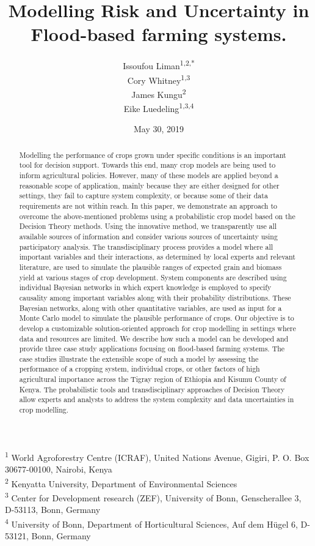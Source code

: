 \documentclass[12pt,oneside]{article}
\title{Modelling Risk and Uncertainty in Flood-based farming systems.}
\author{Issoufou Liman\textsuperscript{1,2,*} \\ Cory Whitney\textsuperscript{1,3} \\ James Kungu\textsuperscript{2} \\ Eike Luedeling\textsuperscript{1,3,4}}
\date{May 30, 2019}
\begin{document}
\maketitle
\begin{abstract}
Modelling the performance of crops grown under specific conditions is an important tool for decision support. Towards this end, many crop models are being used to inform agricultural policies. However, many of these models are applied beyond a reasonable scope of application, mainly because they are either designed for other settings, they fail to capture system complexity, or because some of their data requirements are not within reach. In this paper, we demonstrate an approach to overcome the above-mentioned problems using a probabilistic crop model based on the Decision Theory methods. Using the innovative method, we transparently use all available sources of information and consider various sources of uncertainty using participatory analysis. The transdisciplinary process provides a model where all important variables and their interactions, as determined by local experts and relevant literature, are used to simulate the plausible ranges of expected grain and biomass yield at various stages of crop development. System components are described using individual Bayesian networks in which expert knowledge is employed to specify causality among important variables along with their probability distributions. These Bayesian networks, along with other quantitative variables, are used as input for a Monte Carlo model to simulate the plausible performance of crops. Our objective is to develop a customizable solution-oriented approach for crop modelling in settings where data and resources are limited. We describe how such a model can be developed and provide three case study applications focusing on flood-based farming systems. The case studies illustrate the extensible scope of such a model by assessing the performance of a cropping system, individual crops, or other factors of high agricultural importance across the Tigray region of Ethiopia and Kisumu County of Kenya. The probabilistic tools and transdisciplinary approaches of Decision Theory allow experts and analysts to address the system complexity and data uncertainties in crop modelling.
\end{abstract}

{
\hypersetup{linkcolor=black}
\setcounter{tocdepth}{5}
\tableofcontents
}
\textsuperscript{1} World Agroforestry Centre (ICRAF), United Nations Avenue, Gigiri, P. O. Box 30677-00100, Nairobi, Kenya\\
\textsuperscript{2} Kenyatta University, Department of Environmental Sciences\\
\textsuperscript{3} Center for Development research (ZEF), University of Bonn, Genscherallee 3, D-53113, Bonn, Germany\\
\textsuperscript{4} University of Bonn, Department of Horticultural Sciences, Auf dem Hügel 6, D-53121, Bonn, Germany
\end{document}

